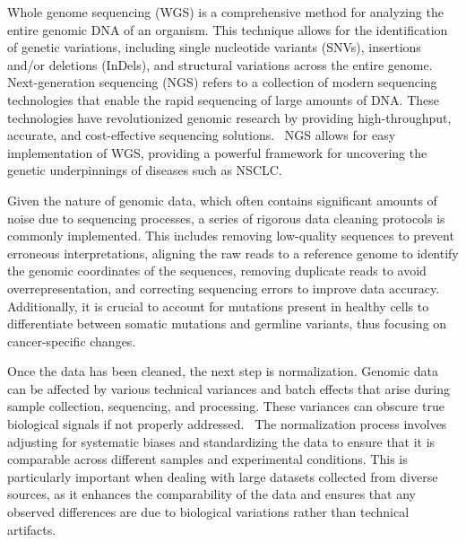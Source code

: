 \vspace{1em}
\noindent
Whole genome sequencing (WGS) is a comprehensive method for analyzing the entire genomic DNA of an organism. 
This technique allows for the identification of genetic variations, including single nucleotide variants (SNVs), 
insertions and/or deletions (InDels), and structural variations across the entire genome. 
Next-generation sequencing (NGS) refers to a collection of modern sequencing technologies that enable the rapid sequencing of large amounts of DNA. 
These technologies have revolutionized genomic research by providing high-throughput, accurate, and cost-effective sequencing solutions.~\cite{koboldt_best_2020-1} 
NGS allows for easy implementation of WGS, providing a powerful framework for uncovering the genetic underpinnings of diseases such as NSCLC.

\vspace{1em}
\noindent
Given the nature of genomic data, which often contains significant amounts of noise due to sequencing processes, 
a series of rigorous data cleaning protocols is commonly implemented. 
This includes removing low-quality sequences to prevent erroneous interpretations, 
aligning the raw reads to a reference genome to identify the genomic coordinates of the sequences, 
removing duplicate reads to avoid overrepresentation, and correcting sequencing errors to improve data accuracy. 
Additionally, it is crucial to account for mutations present in healthy cells to differentiate between 
somatic mutations and germline variants, thus focusing on cancer-specific changes.~\cite{koboldt_best_2020-1,gerstung_evolutionary_2020}

\vspace{1em}
\noindent
Once the data has been cleaned, the next step is normalization. 
Genomic data can be affected by various technical variances and batch effects that arise during sample collection, sequencing, and processing. 
These variances can obscure true biological signals if not properly addressed.~\cite{jaffe_practical_2015} 
The normalization process involves adjusting for systematic biases and standardizing the data to 
ensure that it is comparable across different samples and experimental conditions. 
This is particularly important when dealing with large datasets collected from diverse sources, 
as it enhances the comparability of the data and ensures that any observed differences 
are due to biological variations rather than technical artifacts.


